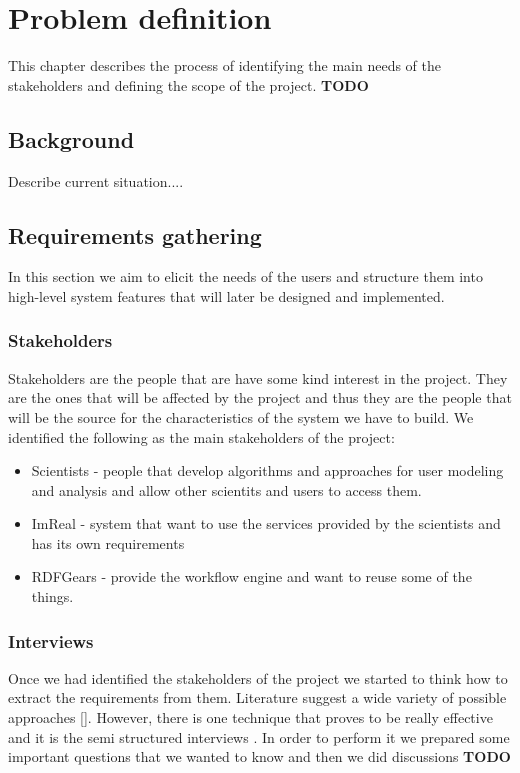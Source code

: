 
\chapter{Problem definition}

This chapter describes the process of identifying the main needs of the stakeholders and defining the scope of the project. \textbf{TODO}

\section{Background}

Describe current situation....

\section{Requirements gathering}

In this section we aim to elicit the needs of the users and structure them into high-level system features that will later be designed and implemented.

\subsection{Stakeholders}

Stakeholders are the people that are have some kind interest in the project. They are the ones that will be affected by the project and thus they are the people that will be the source for the characteristics of the system we have to build. We identified the following as the main stakeholders of the project:  

\begin{itemize}
\item Scientists - people that develop algorithms and approaches for user modeling and analysis and allow other scientits and users to access them.
\item ImReal - system that want to use the services provided by the scientists and has its own requirements
\item RDFGears - provide the workflow engine and want to reuse some of the things.
\end{itemize}

\subsection{Interviews}

Once we had identified the stakeholders of the project we started to think how to extract the requirements from them. Literature suggest a wide variety of possible approaches []. However, there is one technique that proves to be really effective and it is the semi structured interviews \cite{Dieste}. In order to perform it we prepared some important questions that we wanted to know and then we did discussions \textbf{TODO}


